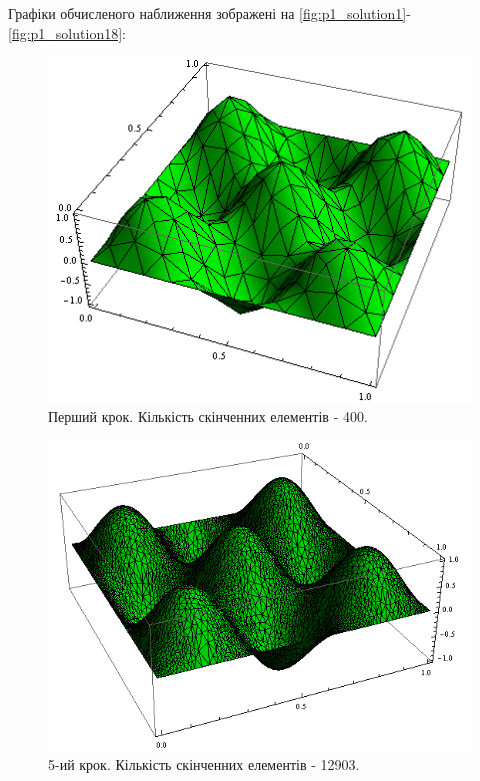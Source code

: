 Графіки обчисленого наближення зображені на \autoref{fig:p1_solution1}-\ref{fig:p1_solution18}:
%
\begin{figure}[H]
	\centering
    \includegraphics[scale=0.9]{problem1/my/solutions/1}
    \caption{Перший крок. Кількість скінченних елементів - 400.}
    \label{fig:p1_solution1}
\end{figure}
%
\begin{figure}[H]
	\centering
    \includegraphics[scale=0.7]{problem1/my/solutions/5}
    \caption{5-ий крок. Кількість скінченних елементів - 12903.}
    \label{fig:p1_solution5}
\end{figure}
%
